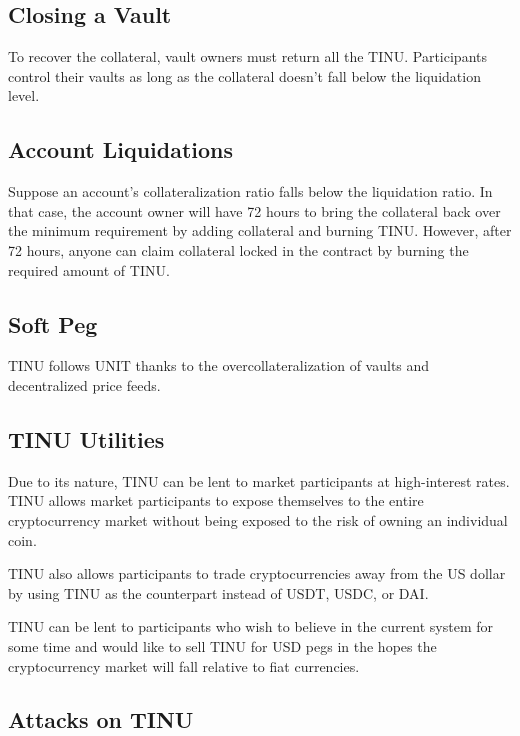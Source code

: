\documentclass[12pt]{article}
\begin{document}
\subsection{Closing a Vault}

To recover the collateral, vault owners must return all the TINU. Participants control their vaults as long as the collateral doesn’t fall below the liquidation level. 


\subsection{Account Liquidations}

Suppose an account's collateralization ratio falls below the liquidation ratio. In that case, the account owner will have 72 hours to bring the collateral back over the minimum requirement by adding collateral and burning TINU. However, after 72 hours, anyone can claim collateral locked in the contract by burning the required amount of TINU.


\subsection{Soft Peg}

TINU follows UNIT thanks to the overcollateralization of vaults and decentralized price feeds.

\subsection{TINU Utilities}

Due to its nature, TINU can be lent to market participants at high-interest rates. TINU allows market participants to expose themselves to the entire cryptocurrency market without being exposed to the risk of owning an individual coin. 

TINU also allows participants to trade cryptocurrencies away from the US dollar by using TINU as the counterpart instead of USDT, USDC, or DAI.

TINU can be lent to participants who wish to believe in the current system for some time and would like to sell TINU for USD pegs in the hopes the cryptocurrency market will fall relative to fiat currencies.



\subsection{Attacks on TINU}
\end{document}
